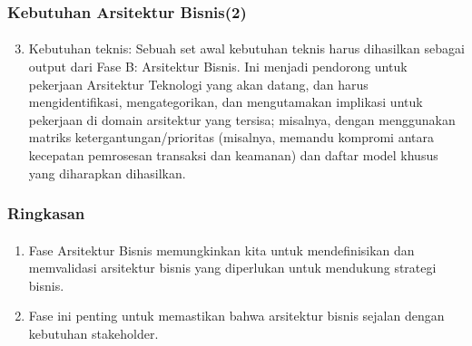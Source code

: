 \documentclass[aspectratio=169, table]{beamer}
\begin{document}
	\begin{frame}
		\frametitle{Kebutuhan Arsitektur Bisnis(2)}
		\framesubtitle{\hspace{1cm}}
		\begin{enumerate}
			\setcounter{enumi}{2}
			\item Kebutuhan teknis: Sebuah set awal kebutuhan teknis harus dihasilkan sebagai output dari Fase B: Arsitektur Bisnis. Ini menjadi pendorong untuk pekerjaan Arsitektur Teknologi yang akan datang, dan harus mengidentifikasi, mengategorikan, dan mengutamakan implikasi untuk pekerjaan di domain arsitektur yang tersisa; misalnya, dengan menggunakan matriks ketergantungan/prioritas (misalnya, memandu kompromi antara kecepatan pemrosesan transaksi dan keamanan) dan daftar model khusus yang diharapkan dihasilkan.
			
		\end{enumerate}
	\end{frame}	
	
	
	\begin{frame}
		\frametitle{Ringkasan}
		\framesubtitle{\hspace{1cm}}
		\begin{enumerate}
			\item Fase Arsitektur Bisnis memungkinkan kita untuk mendefinisikan dan memvalidasi arsitektur bisnis yang diperlukan untuk mendukung strategi bisnis. 
			\item Fase ini penting untuk memastikan bahwa arsitektur bisnis sejalan dengan kebutuhan stakeholder.
		\end{enumerate}
	\end{frame}
	
\end{document}
